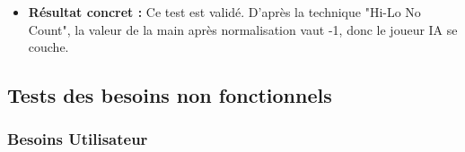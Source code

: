 \begin{enumerate}
\begin{enumerate}
\begin{itemize}
            \item \textbf{Résultat concret : } Ce test est validé. D'après la technique "Hi-Lo No Count", la valeur de la main après normalisation vaut -1, donc le joueur IA se couche.
        \end{itemize}
    
    \end{enumerate}
    
\end{enumerate}

\subsection{Tests des besoins non fonctionnels}

\subsubsection{Besoins Utilisateur}
